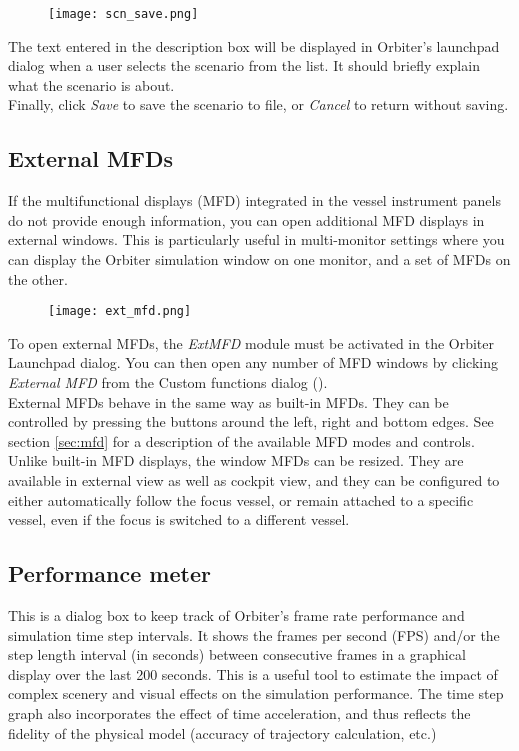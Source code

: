 \documentclass[Orbiter User Manual.tex]{subfiles}
\begin{document}
\begin{figure}[H]
	\centering
	\texttt{[image: scn\_save.png]}
\end{figure}

\noindent
The text entered in the description box will be displayed in Orbiter's launchpad dialog when a user selects the scenario from the list. It should briefly explain what the scenario is about.\\
Finally, click \textit{Save} to save the scenario to file, or \textit{Cancel} to return without saving.


\subsection{External MFDs}
If the multifunctional displays (MFD) integrated in the vessel instrument panels do not provide enough information, you can open additional MFD displays in external windows. This is particularly useful in multi-monitor settings where you can display the Orbiter simulation window on one monitor, and a set of MFDs on the other.

\begin{figure}[H]
	\centering
	\texttt{[image: ext\_mfd.png]}
\end{figure}

\noindent
To open external MFDs, the \textit{ExtMFD} module must be activated in the Orbiter Launchpad dialog. You can then open any number of MFD windows by clicking \textit{External MFD} from the Custom functions dialog (\Ctrl{}).\\
External MFDs behave in the same way as built-in MFDs. They can be controlled by pressing the buttons around the left, right and bottom edges. See section \ref{sec:mfd} for a description of the available MFD modes and controls.\\
Unlike built-in MFD displays, the window MFDs can be resized. They are available in external view as well as cockpit view, and they can be configured to either automatically follow the focus vessel, or remain attached to a specific vessel, even if the focus is switched to a different vessel.


\subsection{Performance meter}
This is a dialog box to keep track of Orbiter's frame rate performance and simulation time step intervals. It shows the frames per second (FPS) and/or the step length interval (in seconds) between consecutive frames in a graphical display over the last 200 seconds. This is a useful tool to estimate the impact of complex scenery and visual effects on the simulation performance. The time step graph also incorporates the effect of time acceleration, and thus reflects the fidelity of the physical model (accuracy of trajectory calculation, etc.)
\end{document}
